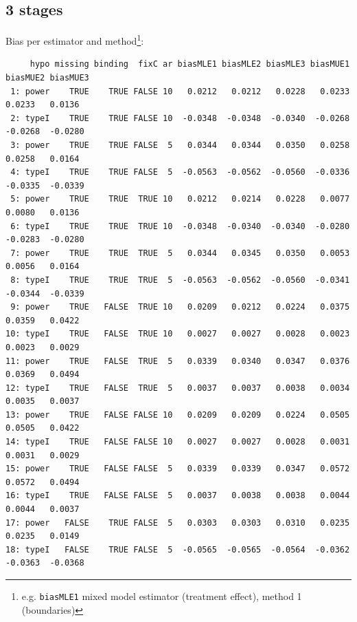 \documentclass[12pt]{article}
\begin{document}
\subsection{3 stages}
\label{sec:orgfdc4f34}
Bias per estimator and method\footnote{e.g. \texttt{biasMLE1} mixed model
estimator (treatment effect), method 1 (boundaries)}:
\begin{adjustwidth}{-1cm}{-1cm}
\begin{verbatim}
     hypo missing binding  fixC ar biasMLE1 biasMLE2 biasMLE3 biasMUE1 biasMUE2 biasMUE3
 1: power    TRUE    TRUE FALSE 10   0.0212   0.0212   0.0228   0.0233   0.0233   0.0136
 2: typeI    TRUE    TRUE FALSE 10  -0.0348  -0.0348  -0.0340  -0.0268  -0.0268  -0.0280
 3: power    TRUE    TRUE FALSE  5   0.0344   0.0344   0.0350   0.0258   0.0258   0.0164
 4: typeI    TRUE    TRUE FALSE  5  -0.0563  -0.0562  -0.0560  -0.0336  -0.0335  -0.0339
 5: power    TRUE    TRUE  TRUE 10   0.0212   0.0214   0.0228   0.0077   0.0080   0.0136
 6: typeI    TRUE    TRUE  TRUE 10  -0.0348  -0.0340  -0.0340  -0.0280  -0.0283  -0.0280
 7: power    TRUE    TRUE  TRUE  5   0.0344   0.0345   0.0350   0.0053   0.0056   0.0164
 8: typeI    TRUE    TRUE  TRUE  5  -0.0563  -0.0562  -0.0560  -0.0341  -0.0344  -0.0339
 9: power    TRUE   FALSE  TRUE 10   0.0209   0.0212   0.0224   0.0375   0.0359   0.0422
10: typeI    TRUE   FALSE  TRUE 10   0.0027   0.0027   0.0028   0.0023   0.0023   0.0029
11: power    TRUE   FALSE  TRUE  5   0.0339   0.0340   0.0347   0.0376   0.0369   0.0494
12: typeI    TRUE   FALSE  TRUE  5   0.0037   0.0037   0.0038   0.0034   0.0035   0.0037
13: power    TRUE   FALSE FALSE 10   0.0209   0.0209   0.0224   0.0505   0.0505   0.0422
14: typeI    TRUE   FALSE FALSE 10   0.0027   0.0027   0.0028   0.0031   0.0031   0.0029
15: power    TRUE   FALSE FALSE  5   0.0339   0.0339   0.0347   0.0572   0.0572   0.0494
16: typeI    TRUE   FALSE FALSE  5   0.0037   0.0038   0.0038   0.0044   0.0044   0.0037
17: power   FALSE    TRUE FALSE  5   0.0303   0.0303   0.0310   0.0235   0.0235   0.0149
18: typeI   FALSE    TRUE FALSE  5  -0.0565  -0.0565  -0.0564  -0.0362  -0.0363  -0.0368
\end{verbatim}
\end{adjustwidth}
\end{document}

